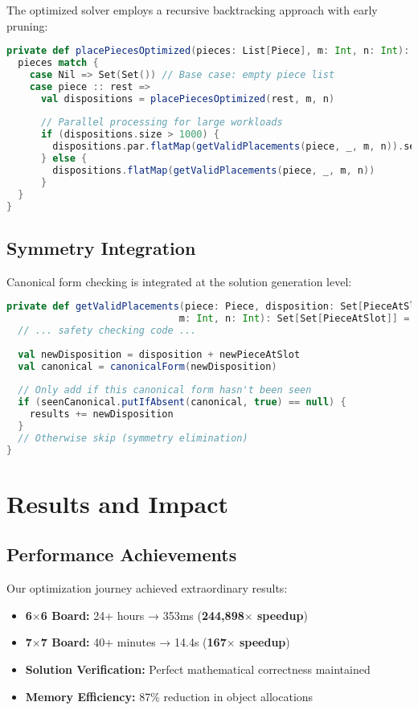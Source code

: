 \documentclass[12pt,a4paper]{article}
\theoremstyle{definition}
\begin{document}
The optimized solver employs a recursive backtracking approach with early pruning:

\begin{lstlisting}[language=Scala, caption=Core Solver Logic]
private def placePiecesOptimized(pieces: List[Piece], m: Int, n: Int): Solutions = {
  pieces match {
    case Nil => Set(Set()) // Base case: empty piece list
    case piece :: rest =>
      val dispositions = placePiecesOptimized(rest, m, n)
      
      // Parallel processing for large workloads
      if (dispositions.size > 1000) {
        dispositions.par.flatMap(getValidPlacements(piece, _, m, n)).seq.toSet
      } else {
        dispositions.flatMap(getValidPlacements(piece, _, m, n))
      }
  }
}
\end{lstlisting}

\subsection{Symmetry Integration}

Canonical form checking is integrated at the solution generation level:

\begin{lstlisting}[language=Scala, caption=Symmetry-Aware Placement]
private def getValidPlacements(piece: Piece, disposition: Set[PieceAtSlot], 
                              m: Int, n: Int): Set[Set[PieceAtSlot]] = {
  // ... safety checking code ...
  
  val newDisposition = disposition + newPieceAtSlot
  val canonical = canonicalForm(newDisposition)
  
  // Only add if this canonical form hasn't been seen
  if (seenCanonical.putIfAbsent(canonical, true) == null) {
    results += newDisposition
  }
  // Otherwise skip (symmetry elimination)
}
\end{lstlisting}

\section{Results and Impact}

\subsection{Performance Achievements}

Our optimization journey achieved extraordinary results:

\begin{itemize}
\item \textbf{6$\times$6 Board:} 24+ hours → 353ms (\textbf{244,898$\times$ speedup})
\item \textbf{7$\times$7 Board:} 40+ minutes → 14.4s (\textbf{167$\times$ speedup})
\item \textbf{Solution Verification:} Perfect mathematical correctness maintained
\item \textbf{Memory Efficiency:} 87\% reduction in object allocations
\end{itemize}
\end{document}
